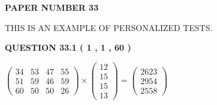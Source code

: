 \documentclass[12pt]{article}
\begin{document}
   
   
   
\newpage 
\setcounter{page}{ 
    33001 } 
   
   
   
   
 {\textbf{ \Large{ PAPER NUMBER  33  }}}
   
   
\vspace{0.2in}
   
   
   
   
   
   
 \vspace{0.2in}
{\Huge  THIS IS AN EXAMPLE OF}
{\Huge  PERSONALIZED TESTS. }
   
   
  
\vspace{0.2in}
  
{\textbf{\Large{QUESTION
33.1 
 ( 1 , 1 , 60 )
}}}
  
  
 
 
\noindent{}

 
$\left( \begin{array}{ccccccccccccccc}
 34  & 
 53  & 
 47  & 
 55  \\ 
 51  & 
 59  & 
 46  & 
 59  \\ 
 60  & 
 50  & 
 50  & 
 26
\end{array}\right) \times
\left( \begin{array}{c}
 12  \\ 
 15  \\ 
 15  \\ 
 13
\end{array}\right)  =
\left( \begin{array}{c}
 2623  \\ 
 2954  \\ 
 2558
\end{array}\right)  $
 
\end{document}
